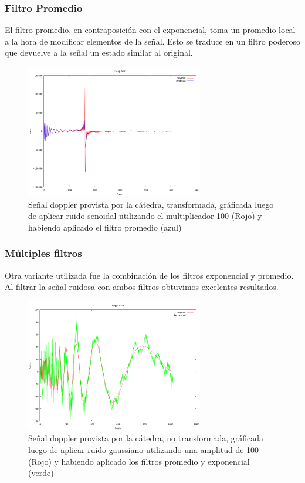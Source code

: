 \subsubsection{Filtro Promedio}

El filtro promedio, en contraposici\'on con el exponencial, toma un promedio
local a la hora de modificar elementos de la se\~nal. Esto se traduce en un
filtro poderoso que devuelve a la se\~nal un estado similar al original.

\begin{figure}
\begin {center}
\includegraphics[width=220pt]{../matlab/dopp512-sin100-avg-spec.png}
\end {center}
\caption{Se\~nal doppler provista por la c\'atedra, transformada, gr\'aficada
luego de aplicar ruido senoidal utilizando el multiplicador 100 (Rojo) y 
habiendo aplicado el filtro promedio (azul)}
\label{fig:SinProm}
\end{figure}

\subsubsection{M\'ultiples filtros}

Otra variante utilizada fue la combinaci\'on de los filtros exponencial y
promedio. Al filtrar la se\~nal ruidosa con ambos filtros obtuvimos excelentes
resultados.

\begin{figure}
\begin {center}
\includegraphics[width=220pt]{../matlab/dopp1024-gauss100-both.png}
\end {center}
\caption{Se\~nal doppler provista por la c\'atedra, no transformada, gr\'aficada
luego de aplicar ruido gaussiano utilizando una amplitud de 100 (Rojo) y 
habiendo aplicado los filtros promedio y exponencial (verde)}
\label{fig:SinProm}
\end{figure}

